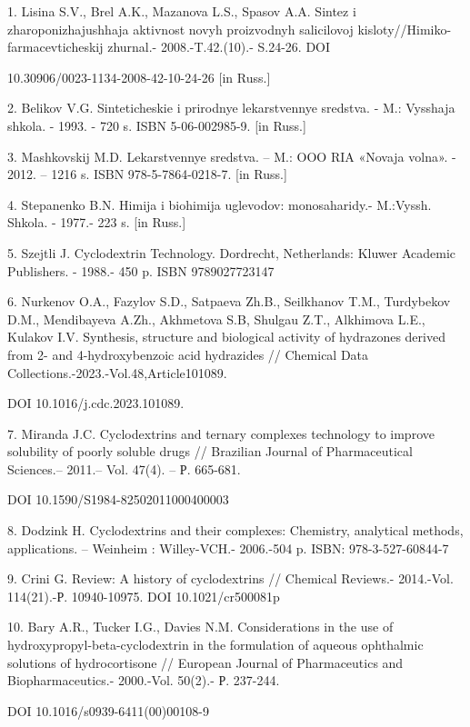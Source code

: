 \begin{noparindent}
1. Lisina S.V., Brel\textquotesingle{} A.K., Mazanova L.S., Spasov A.A.
Sintez i zharoponizhajushhaja aktivnost\textquotesingle{} novyh
proizvodnyh salicilovoj kisloty//Himiko-farmacevticheskij zhurnal.-
2008.-T.42.(10).- S.24-26. DOI 

10.30906/0023-1134-2008-42-10-24-26 {[}in Russ.{]}

2. Belikov V.G. Sinteticheskie i prirodnye lekarstvennye sredstva. - M.:
Vysshaja shkola. - 1993. - 720 s. ISBN 5-06-002985-9. {[}in Russ.{]}

3. Mashkovskij M.D. Lekarstvennye sredstva. -- M.: OOO RIA «Novaja
volna». - 2012. -- 1216 s. ISBN 978-5-7864-0218-7. {[}in Russ.{]}

4. Stepanenko B.N. Himija i biohimija uglevodov: monosaharidy.-
M.:Vyssh. Shkola. - 1977.- 223 s. {[}in Russ.{]}

5. Szejtli J. Cyclodextrin Technology. Dordrecht, Netherlands: Kluwer
Academic Publishers. - 1988.- 450 p. ISBN 9789027723147

6. Nurkenov O.A., Fazylov S.D., Satpaeva Zh.B., Seilkhanov T.M.,
Turdybekov D.M., Mendibayeva A.Zh., Akhmetova S.B, Shulgau Z.T.,
Alkhimova L.E., Kulakov I.V. Synthesis, structure and biological
activity of hydrazones derived from 2- and 4-hydroxybenzoic acid
hydrazides // Chemical Data Collections.-2023.-Vol.48,Article101089.

DOI 10.1016/j.cdc.2023.101089.

7. Miranda J.C. Cyclodextrins and ternary complexes technology to
improve solubility of poorly soluble drugs // Brazilian Journal of
Pharmaceutical Sciences.-- 2011.-- Vol. 47(4). -- Р. 665-681.

DOI 10.1590/S1984-82502011000400003

8. Dodzink H. Cyclodextrins and their complexes: Chemistry, analytical
methods, applications. -- Weinheim : Willey-VCH.- 2006.-504 p. ISBN:
978-3-527-60844-7

9. Crini G. Review: A history of cyclodextrins // Chemical Reviews.-
2014.-Vol. 114(21).-Р. 10940-10975. DOI 10.1021/cr500081p

10. Bary A.R., Tucker I.G., Davies N.M. Considerations in the use of
hydroxypropyl-beta-cyclodextrin in the formulation of aqueous ophthalmic
solutions of hydrocortisone // European Journal of Pharmaceutics and
Biopharmaceutics.- 2000.-Vol. 50(2).- Р. 237-244.

DOI 10.1016/s0939-6411(00)00108-9


\end{noparindent}
